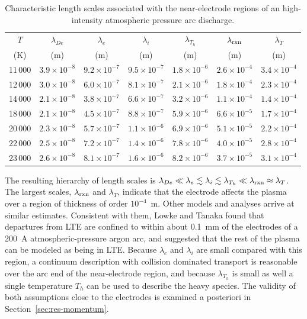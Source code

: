 \begin{table}
\caption{Characteristic length scales associated with the near-electrode regions of an high-intensity atmospheric pressure arc discharge.}
\label{tab:scales}
\centering
\small
\begin{tabular}{ccccccc}
\hline
\(T\) & \(\lambda_{De}\) & \(\lambda_e\) & \(\lambda_i\) & \(\lambda_{T_h}\) & \(\lambda_{\rm rxn}\) & \(\lambda_T\) \\
(K) & (m) & (m) & (m) & (m) & (m) & (m) \\
\hline
11\,000 & \(3.9\times10^{-8}\) & \(9.2\times10^{-7}\) & \(9.5\times10^{-7}\) & \(1.8\times10^{-6}\) & \(2.6\times10^{-4}\) & \(3.4\times10^{-4}\) \\
12\,000 & \(3.0\times10^{-8}\) & \(6.0\times10^{-7}\) & \(8.1\times10^{-7}\) & \(2.1\times10^{-6}\) & \(1.8\times10^{-4}\) & \(2.3\times10^{-4}\) \\
14\,000 & \(2.1\times10^{-8}\) & \(3.8\times10^{-7}\) & \(6.6\times10^{-7}\) & \(3.2\times10^{-6}\) & \(1.1\times10^{-4}\) & \(1.4\times10^{-4}\) \\
18\,000 & \(2.1\times10^{-8}\) & \(4.5\times10^{-7}\) & \(8.8\times10^{-7}\) & \(5.9\times10^{-6}\) & \(6.6\times10^{-5}\) & \(1.7\times10^{-4}\) \\
20\,000 & \(2.3\times10^{-8}\) & \(5.7\times10^{-7}\) & \(1.1\times10^{-6}\) & \(6.9\times10^{-6}\) & \(5.1\times10^{-5}\) & \(2.2\times10^{-4}\) \\
22\,000 & \(2.5\times10^{-8}\) & \(7.2\times10^{-7}\) & \(1.4\times10^{-6}\) & \(7.8\times10^{-6}\) & \(4.0\times10^{-5}\) & \(2.8\times10^{-4}\) \\
23\,000 & \(2.6\times10^{-8}\) & \(8.1\times10^{-7}\) & \(1.6\times10^{-6}\) & \(8.2\times10^{-6}\) & \(3.7\times10^{-5}\) & \(3.1\times10^{-4}\) \\
\hline
\end{tabular}
\end{table}



The resulting hierarchy of length scales is \(\lambda_{De}\ll\lambda_e\lesssim\lambda_i\lesssim\lambda_{T_h}\ll\lambda_{\rm rxn}\approx\lambda_T\). The largest scales, \(\lambda_{\rm rxn}\) and \(\lambda_T\), indicate that the electrode affects the plasma over a region of thickness of order \(10^{-4}\)~m. Other models and analyses \cite{Almeida2008,DinulescuPfender1980,benilov1995model,hsu1983analysis,tashiro2010numerical,semenov2016numerical} arrive at similar estimates. Consistent with them, Lowke and Tanaka \cite{Lowke2006} found that departures from LTE are confined to within about 0.1~mm of the electrodes of a 200~A atmospheric-pressure argon arc, and suggested that the rest of the plasma can be modeled as being in LTE. Because \(\lambda_e\) and \(\lambda_i\) are small compared with this region, a continuum description with collision dominated transport is reasonable over the arc end of the near-electrode region, and because \(\lambda_{T_h}\) is small as well a single temperature \(T_h\) can be used to describe the heavy species. The validity of both assumptions close to the electrodes is examined a posteriori in Section~\ref{sec:res-momentum}.

